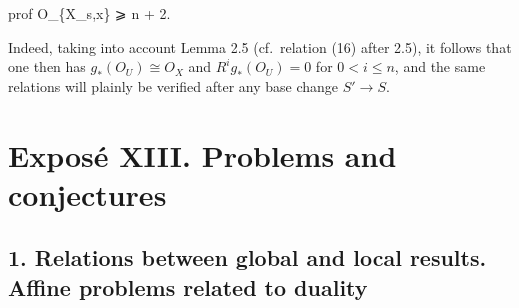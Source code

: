\documentclass[
  11pt,
  a4paper,
]{book}
\newenvironment{Shaded}{}{}
\newcommand{\NormalTok}[1]{#1}
\begin{document}
\begin{enumerate}
\begin{Shaded}
\begin{Highlighting}[]
\NormalTok{prof O\_\{X\_s,x\} ⩾ n + 2.}
\end{Highlighting}
\end{Shaded}

  Indeed, taking into account Lemma 2.5 (cf.~relation (16) after 2.5),
  it follows that one then has \(g_{\ast}(O_{U}) \cong O_{X}\) and
  \(R^{i}g_{\ast}(O_{U}) = 0\) for \(0 < i \leqslant n\), and the same
  relations will plainly be verified after any base change \(S' \to S\).
\end{enumerate}

\chapter{Exposé XIII. Problems and
conjectures}\label{exposuxe9-xiii.-problems-and-conjectures}

\section{1. Relations between global and local results. Affine problems
related to
duality}\label{relations-between-global-and-local-results.-affine-problems-related-to-duality}
\end{document}
